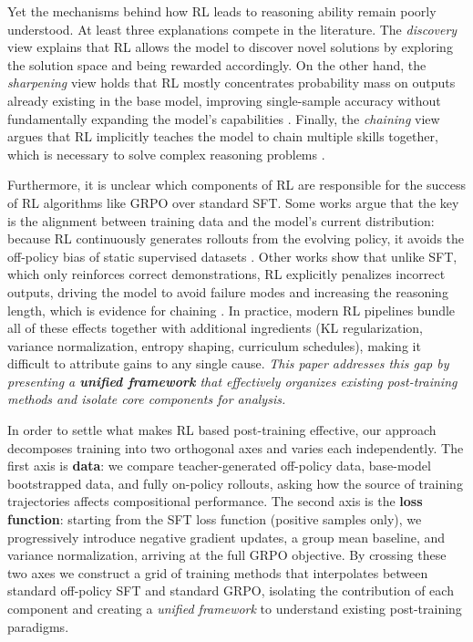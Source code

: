 \documentclass[12pt]{cmuthesis}
\begin{document}
Yet the mechanisms behind how RL leads to reasoning ability remain poorly understood. At least three explanations compete in the literature. The \emph{discovery} view explains that RL allows the model to discover novel solutions by exploring the solution space and being rewarded accordingly. On the other hand, the \emph{sharpening} view holds that RL mostly concentrates probability mass on outputs already existing in the base model, improving single-sample accuracy without fundamentally expanding the model's capabilities \citep{yueDoesReinforcementLearning2025}. Finally, the \emph{chaining} view argues that RL implicitly teaches the model to chain multiple skills together, which is necessary to solve complex reasoning problems \citep{setlurE3LearningExplore2025}.

Furthermore, it is unclear which components of RL are responsible for the success of RL algorithms like GRPO over standard SFT. Some works argue that the key is the alignment between training data and the model's current distribution: because RL continuously generates rollouts from the evolving policy, it avoids the off-policy bias of static supervised datasets \citep{chenRetainingDoingRole2025,mingOneTokenRolloutGuiding2026}.
Other works show that unlike SFT, which only reinforces correct demonstrations, RL explicitly penalizes incorrect outputs, driving the model to avoid failure modes \citep{tian_learning_2026} and increasing the reasoning length, which is evidence for chaining \citep{setlurE3LearningExplore2025}.
In practice, modern RL pipelines bundle all of these effects together with additional ingredients (KL regularization, variance normalization, entropy shaping, curriculum schedules), making it difficult to attribute gains to any single cause. \emph{This paper addresses this gap by presenting a \textbf{unified framework} that effectively organizes existing post-training methods and isolate core components for analysis.}

In order to settle what makes RL based post-training effective, our approach decomposes training into two orthogonal axes and varies each independently.
The first axis is \textbf{data}: we compare teacher-generated off-policy data, base-model bootstrapped data, and fully on-policy rollouts, asking how the source of training trajectories affects compositional performance.
The second axis is the \textbf{loss function}: starting from the SFT loss function (positive samples only), we progressively introduce negative gradient updates, a group mean baseline, and variance normalization, arriving at the full GRPO objective.
By crossing these two axes we construct a grid of training methods that interpolates between standard off-policy SFT and standard GRPO, isolating the contribution of each component and creating a \emph{unified framework} to understand existing post-training paradigms.
\end{document}

